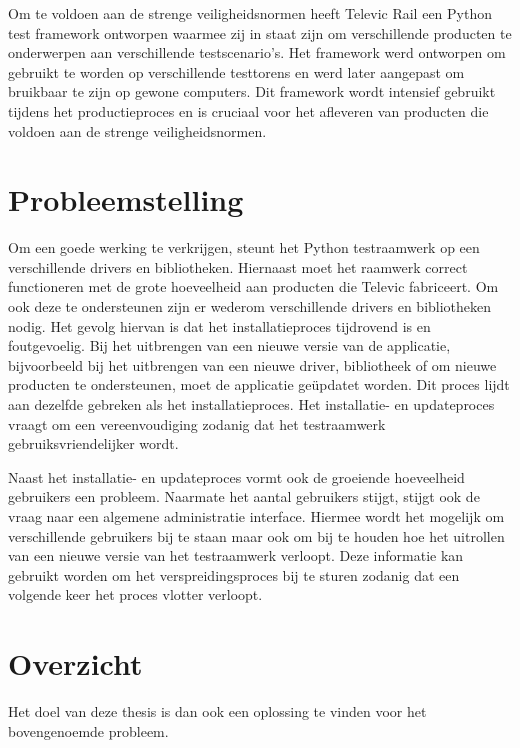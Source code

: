 Om te voldoen aan de strenge veiligheidsnormen heeft Televic Rail een Python test framework ontworpen waarmee zij in staat zijn om verschillende producten te onderwerpen aan verschillende testscenario's.
Het framework werd ontworpen om gebruikt te worden op verschillende testtorens en werd later aangepast om bruikbaar te zijn op gewone computers.
Dit framework wordt intensief gebruikt tijdens het productieproces en is cruciaal voor het afleveren van producten die voldoen aan de strenge veiligheidsnormen.


\section{Probleemstelling}\label{sec:probleem}
Om een goede werking te verkrijgen, steunt het Python testraamwerk op een verschillende drivers en bibliotheken.
Hiernaast moet het raamwerk correct functioneren met de grote hoeveelheid aan producten die Televic fabriceert.
Om ook deze te ondersteunen zijn er wederom verschillende drivers en bibliotheken nodig.
Het gevolg hiervan is dat het installatieproces tijdrovend is en foutgevoelig.
Bij het uitbrengen van een nieuwe versie van de applicatie, bijvoorbeeld bij het uitbrengen van een nieuwe driver, bibliotheek of om nieuwe producten te ondersteunen, moet de applicatie geüpdatet worden.
Dit proces lijdt aan dezelfde gebreken als het installatieproces.
Het installatie- en updateproces vraagt om een vereenvoudiging zodanig dat het testraamwerk gebruiksvriendelijker wordt.

Naast het installatie- en updateproces vormt ook de groeiende hoeveelheid gebruikers een probleem.
Naarmate het aantal gebruikers stijgt, stijgt ook de vraag naar een algemene administratie interface.
Hiermee wordt het mogelijk om verschillende gebruikers bij te staan maar ook om bij te houden hoe het uitrollen van een nieuwe versie van het testraamwerk verloopt.
Deze informatie kan gebruikt worden om het verspreidingsproces bij te sturen zodanig dat een volgende keer het proces vlotter verloopt.

\section{Overzicht}
Het doel van deze thesis is dan ook een oplossing te vinden voor het bovengenoemde probleem.